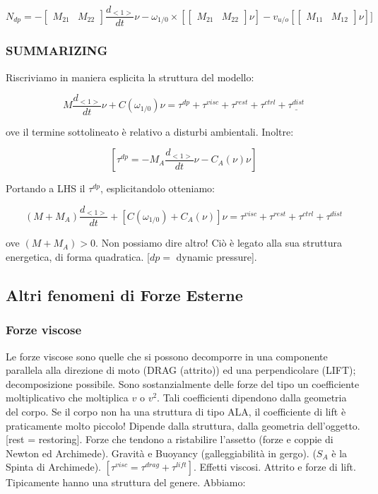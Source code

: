 \[
	N_{dp} = -\begin{bmatrix}M_{21}&M_{22}\end{bmatrix}\frac{d_{<1>}}{dt}\nu - \omega_{1/0}\times [\begin{bmatrix}M_{21}&M_{22}\end{bmatrix}\nu] - v_{u/o}[\begin{bmatrix}M_{11}&M_{12}\end{bmatrix}\nu]]
\]

\subsubsection{SUMMARIZING}

Riscriviamo in maniera esplicita la struttura del modello:

\[
	M\frac{d_{<1>}}{dt}\nu + C(\omega_{1/0})\nu = \tau^{dp} + \tau^{visc} + \tau^{rest} + \tau^{ctrl} + \underline{\tau^{dist}}
\]

ove il termine sottolineato è relativo a disturbi ambientali. Inoltre:

\[
	[\tau^{dp} = -M_A\frac{d_{<1>}}{dt}\nu - C_A(\nu)\nu]
\]

Portando a LHS il $\tau^{dp}$, esplicitandolo otteniamo:

\[
	(M+M_A)\frac{d_{<1>}}{dt} + [C(\omega_{1/0}) + C_A(\nu)]\nu = \tau^{visc} + \tau^{rest} + \tau^{ctrl} + \tau^{dist}
\]

ove $(M+M_A)>0$. Non possiamo dire altro! Ciò è legato alla sua struttura energetica, di forma quadratica. [$dp = $ dynamic pressure].

\subsection{Altri fenomeni di Forze Esterne}

\subsubsection{Forze viscose}

Le forze viscose sono quelle che si possono decomporre in una componente parallela alla direzione di moto (DRAG (attrito)) ed una perpendicolare (LIFT); decomposizione possibile. Sono sostanzialmente delle forze del tipo un coefficiente moltiplicativo che moltiplica $v$ o $v^2$. Tali coefficienti dipendono dalla geometria del corpo. Se il corpo non ha una struttura di tipo ALA, il coefficiente di lift è praticamente molto piccolo! Dipende dalla struttura, dalla geometria dell'oggetto. [rest = restoring]. Forze che tendono a ristabilire l'assetto (forze e coppie di Newton ed Archimede). Gravità e Buoyancy (galleggiabilità in gergo). ($S_A$ è la Spinta di Archimede). $[\tau^{visc}=\tau^{drag}+\tau^{lift}]$. Effetti viscosi. Attrito e forze di lift. Tipicamente hanno una struttura del genere. Abbiamo:

